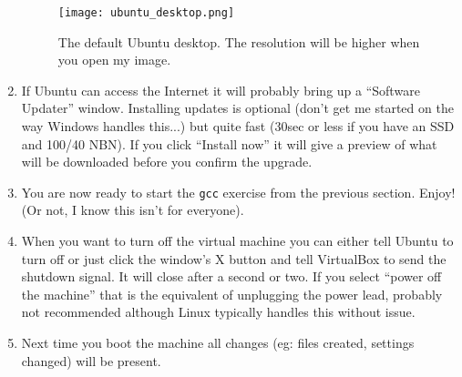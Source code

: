 \documentclass{lab}
\begin{document}
\begin{enumerate}
\begin{figure}[H]
\begin{center}
\texttt{[image: ubuntu\_desktop.png]}
\end{center}
\caption{The default Ubuntu desktop. The resolution will be higher when you open my image.}\label{fig:virtualbox3}
\end{figure}

\item If Ubuntu can access the Internet it will probably bring up a ``Software Updater'' window. Installing updates is optional (don't get me started on the way Windows handles this...) but quite fast (30sec or less if you have an SSD and 100/40 NBN). If you click ``Install now'' it will give a preview of what will be downloaded before you confirm the upgrade.

\item You are now ready to start the \texttt{gcc} exercise from the previous section. Enjoy! (Or not, I know this isn't for everyone).

\item When you want to turn off the virtual machine you can either tell Ubuntu to turn off or just click the window's X button and tell VirtualBox to send the shutdown signal. It will close after a second or two. If you select ``power off the machine'' that is the equivalent of unplugging the power lead, probably not recommended although Linux typically handles this without issue.

\item Next time you boot the machine all changes (eg: files created, settings changed) will be present.

\end{enumerate}
\end{document}
